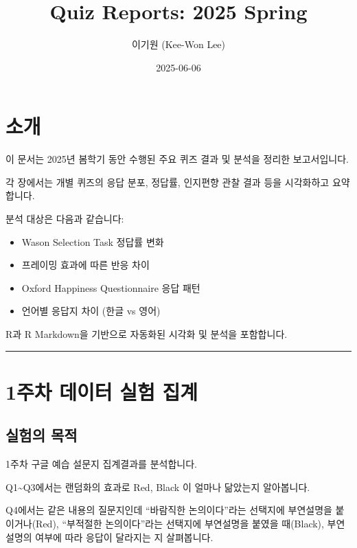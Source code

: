 \documentclass[
]{book}
\title{Quiz Reports: 2025 Spring}
\author{이기원 (Kee-Won Lee)}
\date{2025-06-06}
\providecommand{\tightlist}{%
  \setlength{\itemsep}{0pt}\setlength{\parskip}{0pt}}
\begin{document}
\maketitle

{
\setcounter{tocdepth}{1}
\tableofcontents
}
\chapter*{소개}\label{uxc18cuxac1c}

이 문서는 2025년 봄학기 동안 수행된 주요 퀴즈 결과 및 분석을 정리한 보고서입니다.

각 장에서는 개별 퀴즈의 응답 분포, 정답률, 인지편향 관찰 결과 등을 시각화하고 요약합니다.

분석 대상은 다음과 같습니다:

\begin{itemize}
\tightlist
\item
  Wason Selection Task 정답률 변화
\item
  프레이밍 효과에 따른 반응 차이
\item
  Oxford Happiness Questionnaire 응답 패턴
\item
  언어별 응답지 차이 (한글 vs 영어)
\end{itemize}

R과 R Markdown을 기반으로 자동화된 시각화 및 분석을 포함합니다.

\begin{center}\rule{0.5\linewidth}{0.5pt}\end{center}

\chapter{1주차 데이터 실험 집계}\label{uxc8fcuxcc28-uxb370uxc774uxd130-uxc2e4uxd5d8-uxc9d1uxacc4}

\section{실험의 목적}\label{uxc2e4uxd5d8uxc758-uxbaa9uxc801}

1주차 구글 예습 설문지 집계결과를 분석합니다.

Q1\textasciitilde Q3에서는 랜덤화의 효과로 Red, Black 이 얼마나 닮았는지 알아봅니다.

Q4에서는 같은 내용의 질문지인데 ``바람직한 논의이다''라는 선택지에 부연설명을 붙이거나(Red), ``부적절한 논의이다''라는 선택지에 부연설명을 붙였을 때(Black), 부연설명의 여부에 따라 응답이 달라지는 지 살펴봅니다.
\end{document}
